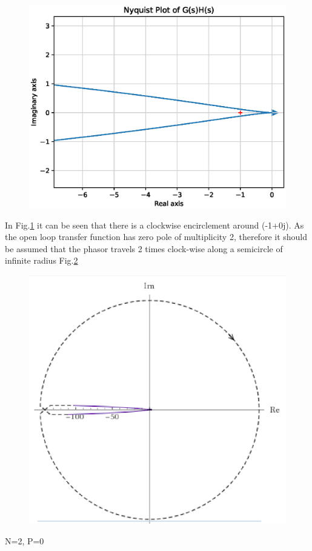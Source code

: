 \begin{enumerate}[label=\thesection.\arabic*.,ref=\thesection.\theenumi]
\begin{figure}[!h]
    \includegraphics[width=\columnwidth]{./figs/ee18btech11041_2.eps}
    \caption{}
    \label{fig:2}
\end{figure}


In Fig.\ref{fig:2} it can be seen that there is a clockwise encirclement around (-1+0j).
As the open loop transfer function has zero pole of multiplicity 2, therefore it should be assumed that the phasor travels 2 times clock-wise along a semicircle of infinite radius Fig.\ref{fig:3} 

\begin{figure}[!h]
    \includegraphics[width=\columnwidth]{./figs/ee18btech11041_3.eps}
    \caption{}
    \label{fig:3}
\end{figure}
\begin{center}
N=2, P=0    
\end{center}


\end{enumerate}
